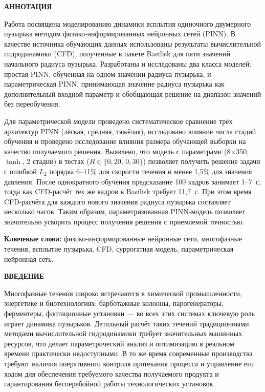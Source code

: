 \newpage
\begin{center}
  \textbf{\large АННОТАЦИЯ}
\end{center}

Работа посвящена моделированию динамики всплытия одиночного двумерного пузырька
методом физико-информированных нейронных сетей (PINN). В качестве источника
обучающих данных использованы результаты вычислительной гидродинамики (CFD),
полученные в пакете Basilisk для пяти значений начального радиуса пузырька.
Разработаны и исследованы два класса моделей: простая PINN, обученная на одном
значении радиуса пузырька, и параметрическая PINN, принимающая значение радиуса пузырька как дополнительный входной параметр и обобщающая решение на диапазон значений без переобучения.

Для параметрической модели проведено систематическое сравнение трёх архитектур PINN
(лёгкая, средняя, тяжёлая), исследовано влияние числа стадий обучения и проведено исследование влияния размера обучающей выборки на качество получаемого решения. Выявлено, что модель с параметрами (8$\times$350, $\tanh$, 2 стадии)
в тестах ($R\in\{0{,}20;\,0{,}30\}$) позволяет получить решение задачи с ошибкой $L_2$ порядка 6--11\% для скорости течения и менее 1{,}5\% для значения давления.
После однократного обучения предсказание 100 кадров занимает 1--7~с,
тогда как CFD-расчёт тех же кадров в Basilisk требует 11{,}7~с.
При этом время CFD-расчёта для каждого нового значения радиуса пузырька составляет несколько часов. Таким образом, параметризованная PINN-модель позволяет значительно ускорить процесс получения решения с приемлемой точностью.

\bigskip
\noindent\textbf{Ключевые слова:} физико-информированные нейронные сети,
многофазные течения, всплытие пузырька, CFD, суррогатная модель,
параметрическая нейронная сеть.

\onehalfspacing
\setcounter{page}{2}

\newpage
\renewcommand{\contentsname}{\centerline{\large СОДЕРЖАНИЕ}}
\tableofcontents

\newpage
\begin{center}
  \textbf{\large ВВЕДЕНИЕ}
\end{center}

Многофазные течения широко встречаются в химической промышленности, энергетике
и биотехнологиях: барботажные колонны, парогенераторы, ферментеры, флотационные
установки --- во всех этих системах ключевую роль играет динамика пузырьков.
Детальный расчёт таких течений традиционными методами вычислительной
гидродинамики требует значительных машинных ресурсов, что делает
параметрический анализ и оптимизацию в реальном времени практически недоступными.
В то же время современные производства требуют наличия оперативного контроля протекания процесса
и управление его ходом для обеспечения требуемого качества получаемого продукта и гарантирования бесперебойной работы технологических установок.


